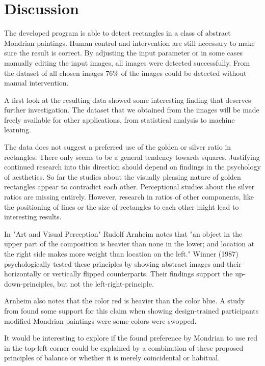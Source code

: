 \documentclass[serif,article,noparskip]{agse-thesis}
\begin{document}

\section{Discussion} \label{conclusion}

The developed program is able to detect rectangles in a class of abstract
Mondrian paintings. Human control and intervention are still necessary to make
sure the result is correct. By adjusting the input parameter or in some cases
manually editing the input images, all images were detected successfully. From
the dataset of all chosen images 76\% of the images could be detected without
manual intervention.

A first look at the resulting data showed some interesting finding that deserves
further investigation. The dataset that we obtained from the images will be made
freely available for other applications, from statistical analysis to machine
learning.

The data does not suggest a preferred use of the golden or silver ratio in
rectangles. There only seems to be a general tendency towards squares.
Justifying continued research into this direction should depend on findings in
the psychology of aesthetics. So far the studies about the visually pleasing
nature of golden rectangles appear to contradict each other. Perceptional
studies about the silver ratios are missing entirely. However, research in  ratios
of other components, like the positioning of lines or the size of rectangles to
each other might lead to interesting results.

In "Art and Visual Perception" Rudolf Arnheim \cite{Arnheim1965} notes that "an
object in the upper part of the composition is heavier than none in the lower;
and location at the right side makes more weight than location on the left."
Winner (1987) \cite{Winner1987} psychologically tested these principles by
showing abstract images and their horizontally or vertically flipped
counterparts. Their findings support the up-down-principles, but not the
left-right-principle.

Arnheim also notes that the color red is heavier than the color blue. A study
from \cite{Locher2005} found some support for this claim when showing
design-trained participants modified Mondrian paintings were some colors were
swopped.

It would be interesting to explore if the found preference by Mondrian to use
red in the top-left corner could be explained by a combination of these proposed
principles of balance or whether it is merely coincidental or habitual.
\end{document}
